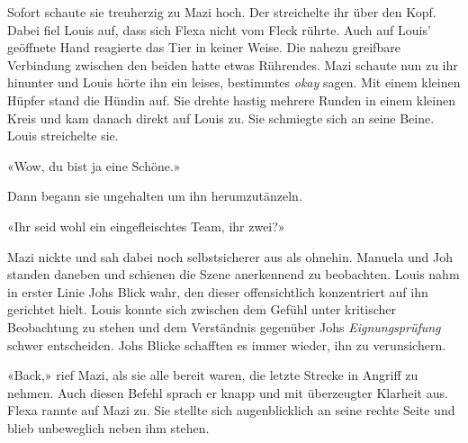 Sofort schaute sie treuherzig zu Mazi hoch. Der streichelte ihr über den
Kopf. Dabei fiel Louis auf, dass sich Flexa nicht vom Fleck rührte. Auch
auf Louis’ geöffnete Hand reagierte das Tier in keiner Weise. Die nahezu
greifbare Verbindung zwischen den beiden hatte etwas Rührendes.
Mazi schaute nun zu ihr hinunter und Louis hörte ihn ein leises,
bestimmtes \emph{okay} sagen. Mit einem kleinen Hüpfer stand die Hündin auf.
Sie drehte hastig mehrere Runden in einem kleinen Kreis und
kam danach direkt auf Louis zu. Sie schmiegte sich an seine Beine. Louis
streichelte sie.

«Wow, du bist ja eine Schöne.»

Dann begann sie ungehalten um ihn herumzutänzeln. 

«Ihr seid wohl ein eingefleischtes Team, ihr zwei?»

Mazi nickte und sah dabei noch selbstsicherer aus als ohnehin. Manuela
und Joh standen daneben und schienen die Szene anerkennend zu
beobachten. Louis nahm in erster Linie Johs Blick wahr, den dieser
offensichtlich konzentriert auf ihn gerichtet hielt. Louis konnte sich
zwischen dem Gefühl unter kritischer Beobachtung zu stehen und dem
Verständnis gegenüber Johs \emph{Eignungsprüfung} schwer entscheiden.
Johs Blicke schafften es immer wieder, ihn zu verunsichern.

«Back,» rief Mazi, als sie alle bereit waren, die letzte Strecke in
Angriff zu nehmen. Auch diesen Befehl sprach er knapp und mit
überzeugter Klarheit aus. Flexa rannte auf Mazi zu. Sie stellte sich
augenblicklich an seine rechte Seite und blieb unbeweglich neben ihm
stehen.
